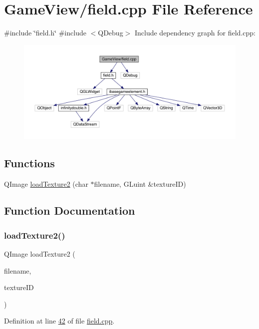 \hypertarget{a00071}{}\section{Game\+View/field.cpp File Reference}
\label{a00071}
{\ttfamily \#include \char`\"{}field.\+h\char`\"{}}\newline
{\ttfamily \#include $<$Q\+Debug$>$}\newline
Include dependency graph for field.\+cpp\+:
\nopagebreak
\begin{figure}[H]
\begin{center}
\leavevmode
\includegraphics[width=350pt]{d6/d2c/a00072}
\end{center}
\end{figure}
\subsection*{Functions}
\begin{DoxyCompactItemize}
\item 
Q\+Image \hyperlink{a00071_a9661f3e3f0b4301dd53d9588fcdbfc04}{load\+Texture2} (char $\ast$filename, G\+Luint \&texture\+ID)
\end{DoxyCompactItemize}


\subsection{Function Documentation}
\mbox{\label{a00071_a9661f3e3f0b4301dd53d9588fcdbfc04}} 
\subsubsection{\texorpdfstring{load\+Texture2()}{loadTexture2()}}
{\footnotesize\ttfamily Q\+Image load\+Texture2 (\begin{DoxyParamCaption}\item[{char $\ast$}]{filename,  }\item[{G\+Luint \&}]{texture\+ID }\end{DoxyParamCaption})}



Definition at line \hyperlink{a00071_source_l00042}{42} of file \hyperlink{a00071_source}{field.\+cpp}.

